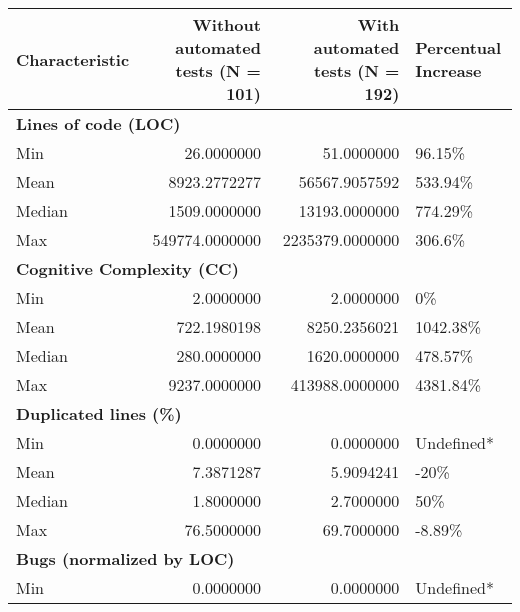 \begin{table}
\centering
\begin{tabular}[t]{l|r|r|l}
\hline
\textbf{Characteristic} & \textbf{Without automated tests (N = 101)} & \textbf{With automated tests (N = 192)} & \textbf{Percentual Increase}\\
\hline
\multicolumn{4}{l}{\textbf{Lines of code (LOC)}}\\
\hline
\hspace{1em}Min & 26.0000000 & 51.0000000 & 96.15\%\\
\hline
\hspace{1em}Mean & 8923.2772277 & 56567.9057592 & 533.94\%\\
\hline
\hspace{1em}Median & 1509.0000000 & 13193.0000000 & 774.29\%\\
\hline
\hspace{1em}Max & 549774.0000000 & 2235379.0000000 & 306.6\%\\
\hline
\multicolumn{4}{l}{\textbf{Cognitive Complexity (CC)}}\\
\hline
\hspace{1em}Min & 2.0000000 & 2.0000000 & 0\%\\
\hline
\hspace{1em}Mean & 722.1980198 & 8250.2356021 & 1042.38\%\\
\hline
\hspace{1em}Median & 280.0000000 & 1620.0000000 & 478.57\%\\
\hline
\hspace{1em}Max & 9237.0000000 & 413988.0000000 & 4381.84\%\\
\hline
\multicolumn{4}{l}{\textbf{Duplicated lines (\%)}}\\
\hline
\hspace{1em}Min & 0.0000000 & 0.0000000 & \vphantom{3} Undefined*\\
\hline
\hspace{1em}Mean & 7.3871287 & 5.9094241 & -20\%\\
\hline
\hspace{1em}Median & 1.8000000 & 2.7000000 & 50\%\\
\hline
\hspace{1em}Max & 76.5000000 & 69.7000000 & -8.89\%\\
\hline
\multicolumn{4}{l}{\textbf{Bugs (normalized by LOC)}}\\
\hline
\hspace{1em}Min & 0.0000000 & 0.0000000 & \vphantom{2} Undefined*\\

\end{tabular}
\end{table}
